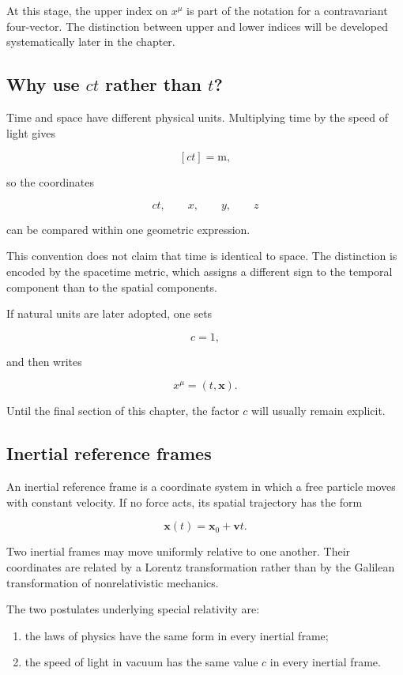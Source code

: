 At this stage, the upper index on \(x^{\mu}\) is part of the notation for a contravariant four-vector. The distinction between upper and lower indices will be developed systematically later in the chapter.

\subsection{Why use \(ct\) rather than \(t\)?}

Time and space have different physical units. Multiplying time by the speed of light gives

\[
[ct]=\mathrm{m},
\]

so the coordinates

\[
ct,
\qquad
x,
\qquad
y,
\qquad
z
\]

can be compared within one geometric expression.

This convention does not claim that time is identical to space. The distinction is encoded by the spacetime metric, which assigns a different sign to the temporal component than to the spatial components.

If natural units are later adopted, one sets

\[
c=1,
\]

and then writes

\[
x^{\mu}=(t,\mathbf{x}).
\]

Until the final section of this chapter, the factor \(c\) will usually remain explicit.

\subsection{Inertial reference frames}

An inertial reference frame is a coordinate system in which a free particle moves with constant velocity. If no force acts, its spatial trajectory has the form

\[
\mathbf{x}(t)
=
\mathbf{x}_{0}
+
\mathbf{v}t.
\]

Two inertial frames may move uniformly relative to one another. Their coordinates are related by a Lorentz transformation rather than by the Galilean transformation of nonrelativistic mechanics.

The two postulates underlying special relativity are:

\begin{enumerate}
    \item the laws of physics have the same form in every inertial frame;
    \item the speed of light in vacuum has the same value \(c\) in every inertial frame.
\end{enumerate}

